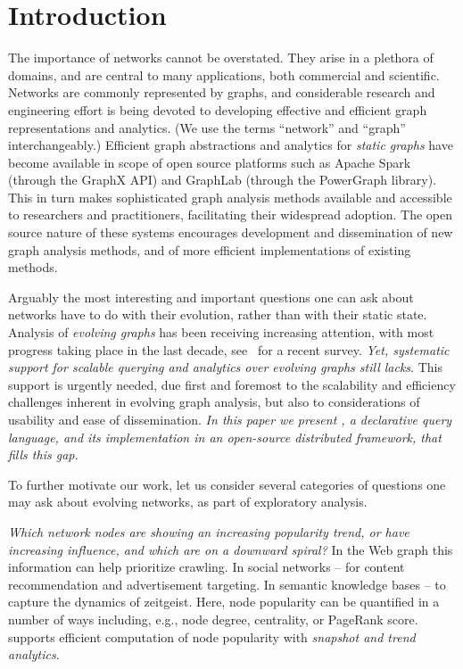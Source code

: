 \section{Introduction}
\label{sec:intro}

The importance of networks cannot be overstated. They arise in a
plethora of domains, and are central to many applications, both
commercial and scientific.  Networks are commonly represented by
graphs, and considerable research and engineering effort is being
devoted to developing effective and efficient graph representations
and analytics. (We use the terms ``network'' and ``graph''
interchangeably.) Efficient graph abstractions and analytics for {\em
  static graphs} have become available in scope of open source
platforms such as Apache Spark (through the GraphX API) and GraphLab
(through the PowerGraph library).  This in turn makes sophisticated
graph analysis methods available and accessible to researchers and
practitioners, facilitating their widespread adoption.  The open
source nature of these systems encourages development and
dissemination of new graph analysis methods, and of more efficient
implementations of existing methods.

Arguably the most interesting and important questions one can ask
about networks have to do with their evolution, rather than with their
static state.  Analysis of {\em evolving graphs} has been receiving
increasing attention, with most progress taking place in the last
decade, see~\cite{DBLP:journals/csur/AggarwalS14} for a recent survey.
{\em Yet, systematic support for scalable querying and analytics over
  evolving graphs still lacks}.  This support is urgently needed, due
first and foremost to the scalability and efficiency challenges
inherent in evolving graph analysis, but also to considerations of
usability and ease of dissemination. {\em In this paper we present
  \ql, a declarative query language, and its implementation in an
  open-source distributed framework, that fills this gap.}

To further motivate our work, let us consider several categories of
questions one may ask about evolving networks, as part of exploratory
analysis.

{\em Which network nodes are showing an increasing popularity trend,
  or have increasing influence, and which are on a downward spiral?}
In the Web graph this information can help prioritize crawling.  In
social networks -- for content recommendation and advertisement
targeting.  In semantic knowledge bases -- to capture the dynamics of
zeitgeist.  Here, node popularity can be quantified in a number of
ways including, e.g., node degree, centrality, or PageRank score.  \ql
supports efficient computation of node popularity with {\em snapshot
  and trend analytics}.

